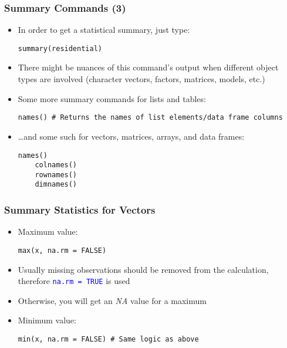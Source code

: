 \documentclass[10pt]{beamer}
\newcommand{\cc}[1]{\texttt{\textcolor{blue}{#1}}}
\theoremstyle{definition}
\begin{document}
\begin{frame}[fragile]
\frametitle{Summary Commands (3)}
\begin{itemize}
	\item In order to get a statistical summary, just type:
	\begin{lstlisting}[style = rstyle, breaklines]
	summary(residential)
	\end{lstlisting}

	\item There might be nuances of this command's output when different object types are involved (character vectors, factors, matrices, models, etc.)
	
	\item Some more summary commands for lists and tables:
	\begin{lstlisting}[style = rstyle, breaklines]
	names() # Returns the names of list elements/data frame columns
	\end{lstlisting}

	\item \ldots and some such for vectors, matrices, arrays, and data frames:
	\begin{lstlisting}[style = rstyle, breaklines]
	names()
	colnames()
	rownames()
	dimnames()
	\end{lstlisting}
\end{itemize}
\end{frame}

\begin{frame}[fragile]
\frametitle{Summary Statistics for Vectors}
\begin{itemize}
	\item Maximum value:
	\begin{lstlisting}[style = rstyle, breaklines]
	max(x, na.rm = FALSE)
	\end{lstlisting}

	\item Usually missing observations should be removed from the calculation, therefore \cc{na.rm = TRUE} is used
	
	\item Otherwise, you will get an \emph{NA} value for a maximum
	
	\item Minimum value:
	\begin{lstlisting}[style = rstyle, breaklines]
	min(x, na.rm = FALSE) # Same logic as above
	\end{lstlisting}
\end{itemize}
\end{frame}
\end{document}
